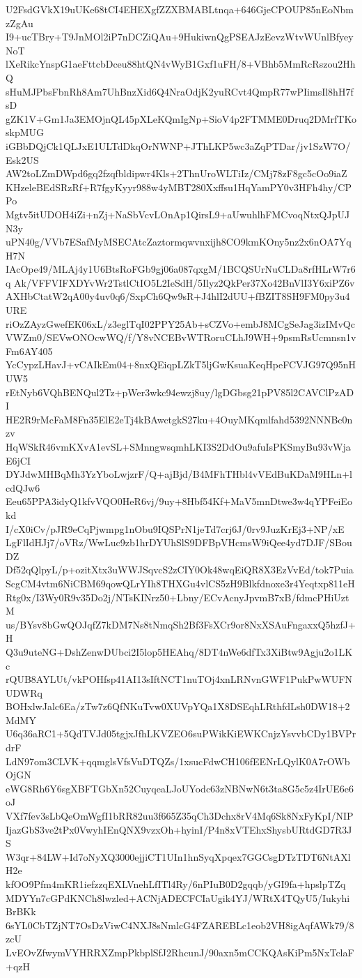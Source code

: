 U2FsdGVkX19uUKe68tCI4EHEXgfZZXBMABLtnqa+646GjeCPOUP85nEoNbmzZgAu
I9+ucTBry+T9JnMOl2iP7nDCZiQAu+9HukiwnQgPSEAJzEevzWtvWUnlBfyeyNoT
lXeRikcYnspG1aeFttcbDceu88htQN4vWyB1Gxf1uFH/8+VBhb5MmRcRszou2HhQ
sHuMJPbsFbnRh8Am7UhBnzXid6Q4NraOdjK2yuRCvt4QmpR77wPIimsIl8hH7fsD
gZK1V+Gm1Ja3EMOjnQL45pXLeKQmIgNp+SioV4p2FTMME0Druq2DMrfTKoskpMUG
iGBbDQjCk1QLJxE1ULTdDkqOrNWNP+JThLKP5wc3aZqPTDar/jv1SzW7O/Esk2US
AW2toLZmDWpd6gq2fzqfbldipwr4Kls+2ThnUroWLTiIz/CMj78zF8gc5cOo9iaZ
KHzeleBEdSRzRf+R7fgyKyyr988w4yMBT280Xxffsu1HqYamPY0v3HFh4hy/CPPo
Mgtv5itUDOH4iZi+nZj+NaSbVcvLOnAp1QirsL9+aUwuhlhFMCvoqNtxQJpUJN3y
uPN40g/VVb7ESafMyMSECAtcZaztormqwvnxijh8CO9kmKOny5nz2x6nOA7YqH7N
IAcOpe49/MLAj4y1U6BtsRoFGb9gj06a087qxgM/1BCQSUrNuCLDa8rfHLrW7r6q
Ak/VFFVIFXDYvWr2TstlCtIO5L2IeSdH/5Ilyz2QkPer37Xo42BnVlI3Y6xiPZ6v
AXHbCtatW2qA00y4uv0q6/SxpCh6Qw9sR+J4hlI2dUU+fBZIT8SH9FM0py3u4URE
riOzZAyzGwefEK06xL/z3eglTqI02PPY25Ab+sCZVo+embJ8MCgSeJag3izIMvQc
VWZm0/SEVwONOcwWQ/f/Y8vNCEBvWTRoruCLhJ9WH+9psmRsUcmnsn1vFm6AY405
YcCypzLHavJ+vCAIkEm04+8nxQEiqpLZkT5ljGwKsuaKeqHpeFCVJG97Q95nHUW5
rEtNyb6VQhBENQul2Tz+pWer3wkc94ewzj8uy/lgDGbsg21pPV85l2CAVClPzADI
HE2R9rMcFaM8Fn35ElE2eTj4kBAwctgkS27ku+4OuyMKqmlfahd5392NNNBc0nzv
HqWSkR46vmKXvA1evSL+SMnngwsqmhLKI3S2DdOu9afuIsPKSmyBu93vWjaE6jCI
DYJdwMHBqMh3YzYboLwjzrF/Q+ajBjd/B4MFhTHbl4vVEdBuKDaM9HLn+lcdQJw6
Eeu65PPA3idyQ1kfvVQO0HeR6vj/9uy+8Hbf54Kf+MaV5mnDtwe3w4qYPFeiEokd
I/cX0iCv/pJR9eCqPjwmpg1nObu9IQSPrN1jeTd7crj6J/0rv9JuzKrEj3+NP/xE
LgFlIdHJj7/oVRz/WwLuc9zb1hrDYUhSlS9DFBpVHcmsW9iQee4yd7DJF/SBouDZ
Df52qQlpyL/p+ozitXtx3uWWJSqvcS2zCIY0Ok48wqEiQR8X3EzVvEd/tok7Puia
ScgCM4vtm6NiCBM69qowQLrYIh8THXGu4vlCS5zH9Blkfdnoxe3r4Yeqtxp811eH
Rtg0x/I3Wy0R9v35Do2j/NTsKINrz50+Lbny/ECvAcnyJpvmB7xB/fdmcPHiUztM
us/BYsv8bGwQOJqfZ7kDM7Ns8tNmqSh2Bf3FsXCr9or8NxXSAuFngaxxQ5hzfJ+H
Q3u9uteNG+DshZenwDUbci2I5lop5HEAhq/8DT4nWe6dfTx3XiBtw9Agju2o1LKc
rQUB8AYLUt/vkPOHfsp41AI13sIftNCT1nuTOj4xnLRNvnGWF1PukPwWUFNUDWRq
BOHxlwJalc6Ea/zTw7z6QfNKuTvw0XUVpYQa1X8DSEqhLRthfdLsh0DW18+2MdMY
U6q36aRC1+5QdTVJd05tgjxJfhLKVZEO6suPWikKiEWKCnjzYsvvbCDy1BVPrdrF
LdN97om3CLVK+qqmglsVfsVuDTQZs/1xsucFdwCH106fEENrLQylK0A7rOWbOjGN
eWG8Rh6Y6sgXBFTGbXn52CuyqeaLJoUYodc63zNBNwN6t3ta8G5c5z4IrUE6e6oJ
VXf7fev3sLbQeOmWgfI1bRR82uu3f665Z35qCh3Dchx8rV4Mq6Sk8NxFyKpI/NIP
IjazGbS3ve2tPx0VwyhIEnQNX9vzxOh+hyinI/P4n8xVTEhxShysbURtdGD7R3JS
W3qr+84LW+Id7oNyXQ3000ejjiCT1UIn1hnSyqXpqex7GGCsgDTzTDT6NtAXlH2e
kfOO9Pfm4mKR1iefzzqEXLVnehLfITl4Ry/6nPIuB0D2gqqb/yGI9fa+hpslpTZq
MDYYn7cGPdKNCh8lwzled+ACNjADECFCIaUgik4YJ/WRtX4TQyU5/IukyhiBrBKk
6sYL0CbTZjNT7OsDzViwC4NXJ8sNmlcG4FZAREBLc1eob2VH8igAqfAWk79/8zcU
LvEOvZfwymVYHRRXZmpPkbplSfJ2RhcunJ/90axn5mCCKQAsKiPm5NxTclaF+qzH
